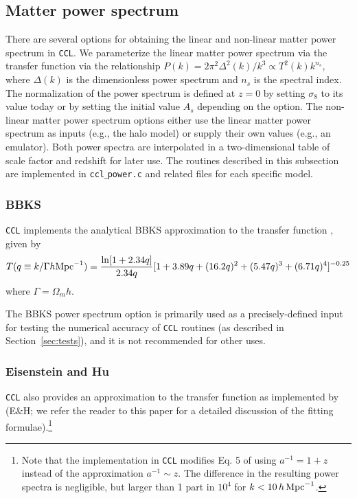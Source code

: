\documentclass[\docopts]{\docclass}
\newcommand{\ccl}{{\tt CCL}\xspace}
\begin{document}
\subsection{Matter power spectrum}
\label{sec:power}

There are several options for obtaining the linear and non-linear matter power spectrum in \ccl.
We parameterize the linear matter power spectrum via the transfer function via the relationship
$P(k) = 2 \pi^2 \Delta^2(k) /k^3  \propto T^2(k) k^{n_s}$, where $\Delta(k)$ is the dimensionless power
spectrum and $n_s$ is the spectral index. The normalization of the power spectrum is defined at $z=0$ by
setting $\sigma_8$ to its value today or by setting the initial value $A_s$ depending on the option.
The non-linear matter power spectrum options either use the linear matter power spectrum as inputs (e.g., the halo model)
or supply their own values (e.g., an emulator). Both power spectra are interpolated in a two-dimensional
table of scale factor and redshift for later use. The routines described in this subsection are
implemented in {\tt ccl$\_$power.c} and related files for each specific model.

\subsubsection{BBKS}
\ccl implements the analytical BBKS approximation to the transfer function \citep{BBKS}, given by
\begin{equation}
T(q\equiv k/\Gamma h {\rm Mpc}^{-1}) = \frac{\ln[1+2.34q]}{2.34q}[1+3.89q+(16.2q)^2+(5.47q)^3+(6.71q)^4]^{-0.25}
\end{equation}
where $\Gamma = \Omega_m h$.

The BBKS power spectrum option is primarily used as a precisely-defined input for testing the numerical accuracy of \ccl routines (as described in Section~\ref{sec:tests}), and it is not recommended for other uses.

\subsubsection{Eisenstein and Hu}
\ccl also provides an approximation to the transfer function as implemented by
\citet{1998ApJ...496..605E} (E\&H; we refer the reader to this paper for a detailed
discussion of the fitting formulae).\footnote{Note that the implementation in \ccl modifies Eq. 5 of \citet{1998ApJ...496..605E} using $a^{-1}=1+z$ instead of the approximation $a^{-1}\sim z$. The difference in the resulting power spectra is negligible, but larger than 1 part in $10^4$ for $k<10\,h\,{\rm Mpc}^{-1}$.}
\end{document}
